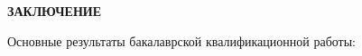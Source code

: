 \newpage
\begin{flushleft}
  \textbf{\large ЗАКЛЮЧЕНИЕ}
\end{flushleft}


Основные результаты бакалаврской квалификационной работы:
